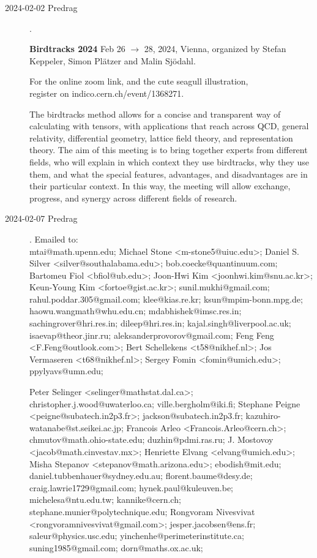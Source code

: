 \begin{description}
\item[2024-02-02 Predrag].

\textbf{Birdtracks 2024}
Feb 26  $\to$ 28, 2024, Vienna,
organized by Stefan Keppeler, Simon Pl{\"a}tzer and Malin Sj{\"o}dahl.

For the online zoom link, and the cute seagull illustration,
\\ register on
{indico.cern.ch/event/1368271}.

The birdtracks method allows for a concise and transparent way of
calculating with tensors, with applications that reach across QCD,
general relativity, differential geometry, lattice field theory, and
representation theory. The aim of this meeting is to bring together
experts from different fields, who will explain in which context they use
birdtracks, why they use them, and what the special features, advantages,
and disadvantages are in their particular context. In this way, the
meeting will allow exchange, progress, and synergy across different
fields of research.

\item[2024-02-07 Predrag].
Emailed to:\\


mtai@math.upenn.edu;
Michael Stone <m-stone5@uiuc.edu>; Daniel S. Silver <silver@southalabama.edu>;
bob.coecke@quantinuum.com;
Bartomeu Fiol <bfiol@ub.edu>;
Joon-Hwi Kim <joonhwi.kim@snu.ac.kr>;
Keun-Young Kim <fortoe@gist.ac.kr>;
sunil.mukhi@gmail.com; rahul.poddar.305@gmail.com;
klee@kias.re.kr; ksun@mpim-bonn.mpg.de; haowu.wangmath@whu.edu.cn;
mdabhishek@imsc.res.in; sachingrover@hri.res.in;
dileep@hri.res.in; kajal.singh@liverpool.ac.uk;
isaevap@theor.jinr.ru; aleksanderprovorov@gmail.com;
Feng Feng <F.Feng@outlook.com>;
Bert Schellekens <t58@nikhef.nl>;
 Jos Vermaseren <t68@nikhef.nl>;
 Sergey Fomin <fomin@umich.edu>; ppylyavs@umn.edu;

Peter Selinger <selinger@mathstat.dal.ca>;
christopher.j.wood@uwaterloo.ca;
ville.bergholm@iki.fi;
Stephane Peigne <peigne@subatech.in2p3.fr>;
jackson@subatech.in2p3.fr;
kazuhiro-watanabe@st.seikei.ac.jp;
Francois Arleo <Francois.Arleo@cern.ch>;
chmutov@math.ohio-state.edu; duzhin@pdmi.ras.ru;
J. Mostovoy <jacob@math.cinvestav.mx>;
Henriette Elvang <elvang@umich.edu>;
Misha Stepanov <stepanov@math.arizona.edu>;
ebodish@mit.edu; daniel.tubbenhauer@sydney.edu.au;
florent.baume@desy.de; craig.lawrie1729@gmail.com;
hynek.paul@kuleuven.be; michelesa@ntu.edu.tw;
kannike@cern.ch; stephane.munier@polytechnique.edu;
Rongvoram Nivesvivat <rongvoramnivesvivat@gmail.com>;
jesper.jacobsen@ens.fr; saleur@physics.usc.edu;
yinchenhe@perimeterinstitute.ca;
suning1985@gmail.com;
dorn@maths.ox.ac.uk;


\end{description}

